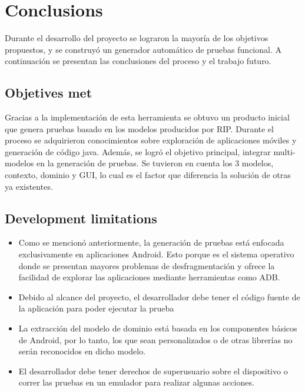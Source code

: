 %
\chapter{Conclusions}
\label{chapter5}

Durante el desarrollo del proyecto se lograron la mayoría de los objetivos propuestos, y se construyó un generador automático de pruebas funcional. A continuación se presentan las conclusiones del proceso y el trabajo futuro.

\section{Objetives met}

Gracias a la implementación de esta herramienta se obtuvo un producto inicial que genera pruebas basado en los modelos producidos por RIP. Durante el proceso se adquirieron conocimientos sobre exploración de aplicaciones móviles y generación de código java. Además, se logró el objetivo principal, integrar multi-modelos en la generación de pruebas. Se tuvieron en cuenta los 3 modelos, contexto, dominio y GUI, lo cual es el factor que diferencia la solución de otras ya existentes.


\section{Development limitations}
\begin{itemize}
	\item Como se mencionó anteriormente, la generación de pruebas está enfocada exclusivamente en aplicaciones Android. Esto porque es el sistema operativo donde se presentan mayores problemas de desfragmentación y ofrece la facilidad de explorar las aplicaciones mediante herramientas como ADB.
	
	\item Debido al alcance del proyecto, el desarrollador debe tener el código fuente de la aplicación para poder ejecutar la prueba
	
	\item La extracción del modelo de dominio está basada en los componentes básicos de Android, por lo tanto, los que sean personalizados o de otras librerías no serán reconocidos en dicho modelo.
	
	\item El desarrollador debe tener derechos de superusuario sobre el dispositivo o correr las pruebas en un emulador para realizar algunas acciones.
	
	
\end{itemize}


